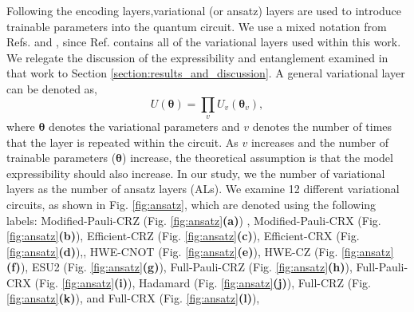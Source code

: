 \documentclass[journal=jacsat,manuscript=article]{achemso}
\begin{document}
Following the encoding layers,variational (or ansatz) layers are used to introduce trainable parameters into the quantum circuit.
We use a mixed notation from Refs. \citep{suzuki_predicting_2020} and \citep{sim_expressibility_2019}, since Ref. \citep{sim_expressibility_2019} contains all of the variational layers used within this work.
We relegate the discussion of the expressibility and entanglement examined in that work to Section \ref{section:results_and_discussion}.
A general variational layer can be denoted as,
\begin{equation}
	U(\bm{\theta}) = \prod_{v} U_{v}(\bm{\theta}_{v}), %
	\label{eq:general_variational}
\end{equation}
where $\bm{\theta}$ denotes the variational parameters and $v$ denotes the number of times that the layer is repeated within the circuit. 
As $v$ increases and the number of trainable parameters ($\bm{\theta}$) increase, the theoretical assumption is that the model expressibility should also increase.
In our study, we the number of variational layers as the number of ansatz layers (ALs).
We examine 12 different variational circuits, as shown in Fig. \ref{fig:ansatz}, which are denoted using the following labels: Modified-Pauli-CRZ (Fig. \ref{fig:ansatz}\textbf{(a)}) , Modified-Pauli-CRX (Fig. \ref{fig:ansatz}\textbf{(b)}), Efficient-CRZ (Fig. \ref{fig:ansatz}\textbf{(c)}), Efficient-CRX (Fig. \ref{fig:ansatz}\textbf{(d)}),, HWE-CNOT (Fig. \ref{fig:ansatz}\textbf{(e)}), HWE-CZ (Fig. \ref{fig:ansatz}\textbf{(f)}), ESU2 (Fig. \ref{fig:ansatz}\textbf{(g)}), Full-Pauli-CRZ (Fig. \ref{fig:ansatz}\textbf{(h)}), Full-Pauli-CRX (Fig. \ref{fig:ansatz}\textbf{(i)}), Hadamard (Fig. \ref{fig:ansatz}\textbf{(j)}), Full-CRZ (Fig. \ref{fig:ansatz}\textbf{(k)}), and Full-CRX (Fig. \ref{fig:ansatz}\textbf{(l)}),
\end{document}
